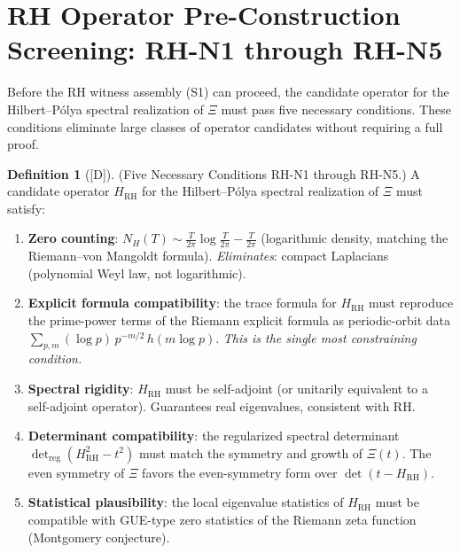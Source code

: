 \documentclass[12pt,oneside]{amsbook}
\theoremstyle{plain}
\theoremstyle{definition}
\newtheorem{definition}[theorem]{Definition}
\theoremstyle{remark}
\newcommand{\status}[1]{\textup{[#1]}}
\begin{document}
\section{RH Operator Pre-Construction Screening: RH-N1 through RH-N5}
\label{sec:rh-screening}

Before the RH witness assembly (S1) can proceed, the candidate
operator for the Hilbert--P\'olya spectral realization of $\Xi$
must pass five necessary conditions. These conditions eliminate
large classes of operator candidates without requiring a full proof.

\begin{definition}[\status{D}]\label{def:RH-necessary-conditions}
\textup{(Five Necessary Conditions RH-N1 through RH-N5.)}
A candidate operator $H_{\mathrm{RH}}$ for the Hilbert--P\'olya
spectral realization of $\Xi$ must satisfy:
\begin{enumerate}[label=\textup{(RH-N\arabic*)}]
 \item \textbf{Zero counting}: $N_{H}(T) \sim
 \frac{T}{2\pi}\log\frac{T}{2\pi} - \frac{T}{2\pi}$
 (logarithmic density, matching the Riemann--von Mangoldt
 formula). \emph{Eliminates}: compact Laplacians (polynomial
 Weyl law, not logarithmic).
 \item \textbf{Explicit formula compatibility}: the trace formula
 for $H_{\mathrm{RH}}$ must reproduce the prime-power terms
 of the Riemann explicit formula as periodic-orbit data
 $\sum_{p,m} (\log p)\, p^{-m/2}\, h(m\log p)$.
 \emph{This is the single most constraining condition.}
 \item \textbf{Spectral rigidity}: $H_{\mathrm{RH}}$ must be
 self-adjoint (or unitarily equivalent to a self-adjoint
 operator). Guarantees real eigenvalues, consistent with RH.
 \item \textbf{Determinant compatibility}: the regularized
 spectral determinant $\det_{\mathrm{reg}}(H_{\mathrm{RH}}^2
 - t^2)$ must match the symmetry and growth of $\Xi(t)$.
 The even symmetry of $\Xi$ favors the even-symmetry form
 over $\det(t - H_{\mathrm{RH}})$.
 \item \textbf{Statistical plausibility}: the local eigenvalue
 statistics of $H_{\mathrm{RH}}$ must be compatible with
 GUE-type zero statistics of the Riemann zeta function
 (Montgomery conjecture).
\end{enumerate}
\end{definition}
\end{document}
